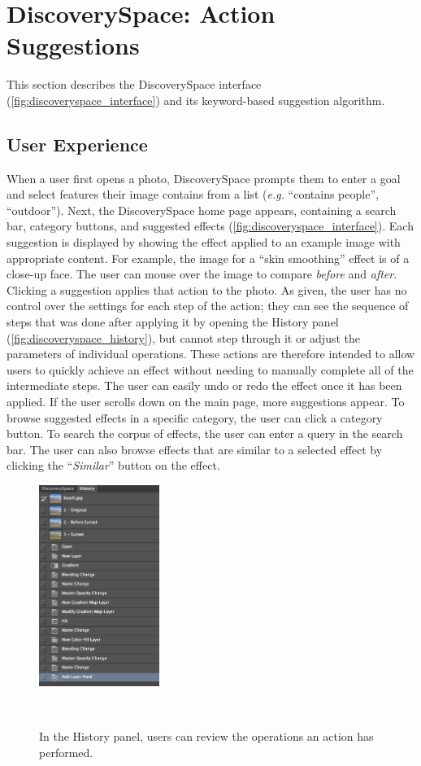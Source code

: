 \section{DiscoverySpace: Action Suggestions}
This section describes the Discovery\-Space interface (\autoref{fig:discoveryspace_interface}) and its keyword-based suggestion algorithm.

\subsection{User Experience}
When a user first opens a photo, Discovery\-Space prompts them to enter a goal and select features their image contains from a list (\textit{e.g.} ``contains people'', ``outdoor''). Next, the Discovery\-Space home page appears, containing a search bar, category buttons, and suggested effects (\autoref{fig:discoveryspace_interface}). Each suggestion is displayed by showing the effect applied to an example image with appropriate content. For example, the image for a ``skin smoothing'' effect is of a close-up face. The user can mouse over the image to compare \textit{before} and \textit{after}. Clicking a suggestion applies that action to the photo. As given, the user has no control over the settings for each step of the action; they can see the sequence of steps that was done after applying it by opening the History panel (\autoref{fig:discoveryspace_history}), but cannot step through it or adjust the parameters of individual operations. These actions are therefore intended to allow users to quickly achieve an effect without needing to manually complete all of the intermediate steps. The user can easily undo or redo the effect once it has been applied. If the user scrolls down on the main page, more suggestions appear. To browse suggested effects in a specific category, the user can click a category button. To search the corpus of effects, the user can enter a query in the search bar. The user can also browse effects that are similar to a selected effect by clicking the ``\textit{Similar}'' button on the effect. 

\begin{figure}[b!]
\centering
  \includegraphics[width=0.35\textwidth]{discoveryspace/figures/history.png}
  \caption{In the History panel, users can review the operations an action has performed.}~\label{fig:discoveryspace_history}
\end{figure}

